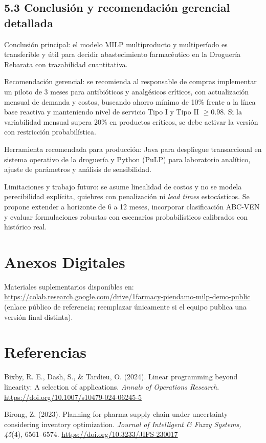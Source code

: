 \documentclass[12pt,letterpaper]{article}
\begin{document}
\subsection{5.3 Conclusión y recomendación gerencial detallada}
Conclusión principal: el modelo MILP multiproducto y multiperíodo es transferible y útil para decidir abastecimiento farmacéutico en la Droguería Rebarata con trazabilidad cuantitativa.

Recomendación gerencial: se recomienda al responsable de compras implementar un piloto de 3 meses para antibióticos y analgésicos críticos, con actualización mensual de demanda y costos, buscando ahorro mínimo de 10\% frente a la línea base reactiva y manteniendo nivel de servicio Tipo I y Tipo II $\ge 0.98$. Si la variabilidad mensual supera 20\% en productos críticos, se debe activar la versión con restricción probabilística.

Herramienta recomendada para producción: Java para despliegue transaccional en sistema operativo de la droguería y Python (PuLP) para laboratorio analítico, ajuste de parámetros y análisis de sensibilidad.

Limitaciones y trabajo futuro: se asume linealidad de costos y no se modela perecibilidad explícita, quiebres con penalización ni \textit{lead times} estocásticos. Se propone extender a horizonte de 6 a 12 meses, incorporar clasificación ABC-VEN y evaluar formulaciones robustas con escenarios probabilísticos calibrados con histórico real.

\section*{Anexos Digitales}
Materiales suplementarios disponibles en: \url{https://colab.research.google.com/drive/1farmacy-piendamo-milp-demo-public} (enlace público de referencia; reemplazar únicamente si el equipo publica una versión final distinta).

\section{Referencias}
\begingroup
{}
\fontsize{11}{13}\selectfont
\setlength{\parindent}{1.27cm}
\setlength{\parskip}{8pt}
Bixby, R. E., Dash, S., \& Tardieu, O. (2024). Linear programming beyond linearity: A selection of applications. \textit{Annals of Operations Research}. \url{https://doi.org/10.1007/s10479-024-06245-5}

Birong, Z. (2023). Planning for pharma supply chain under uncertainty considering inventory optimization. \textit{Journal of Intelligent \& Fuzzy Systems, 45}(4), 6561--6574. \url{https://doi.org/10.3233/JIFS-230017}
\end{document}
